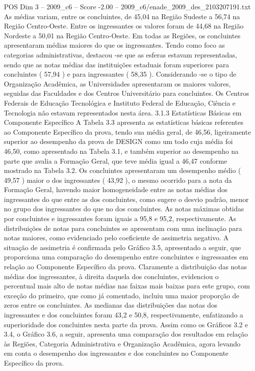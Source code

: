 \begin{textsample}{POS Dim 3 – 2009\_c6 – Score -2.00 – 2009\_c6/enade\_2009\_des\_2103207191.txt}
As médias variam, entre os concluintes, de 45,04 na Região Sudeste a 56,74 na Região Centro-Oeste.
Entre os ingressantes os valores foram de 44,68 na Região Nordeste a 50,01 na Região Centro-Oeste.
Em todas as Regiões, os concluintes apresentaram médias maiores do que os ingressantes.
Tendo como foco as categorias administrativas, destacou -se que as esferas estavam representadas, sendo que as notas médias das instituições estaduais foram superiores para concluintes ( 57,94 ) e para ingressantes ( 58,35 ).
Considerando -se o tipo de Organização Acadêmica, as Universidades apresentaram os maiores valores, seguidas das Faculdades e dos Centros Universitário para concluintes.
Os Centros Federais de Educação Tecnológica e Instituto Federal de Educação, Ciência e Tecnologia não estavam representados nesta área. 3.1.3 Estatísticas Básicas em Componente Específico A Tabela 3.3 apresenta as estatísticas básicas referentes ao Componente Específico da prova, tendo sua média geral, de 46,56, ligeiramente superior ao desempenho da prova de DESIGN como um todo cuja média foi 46,50, como apresentado na Tabela 3.1, e também superior ao desempenho na parte que avalia a Formação Geral, que teve média igual a 46,47 conforme mostrado na Tabela 3.2.
Os concluintes apresentaram um desempenho médio ( 49,57 ) maior o dos ingressantes ( 43,92 ), o mesmo ocorrido para a nota da Formação Geral, havendo maior homogeneidade entre as notas médias dos ingressantes do que entre as dos concluintes, como sugere o desvio padrão, menor no grupo dos ingressantes do que no dos concluintes.
As notas máximas obtidas por concluintes e ingressantes foram iguais a 95,8 e 95,2, respectivamente.
As distribuições de notas para concluintes se apresentam com uma inclinação para notas maiores, como evidenciado pelo coeficiente de assimetria negativo.
A situação de assimetria é confirmada pelo Gráfico 3.5, apresentado a seguir, que proporciona uma comparação do desempenho entre concluintes e ingressantes em relação ao Componente Específico da prova.
Claramente a distribuição das notas médias dos ingressantes, à direita daquela dos concluintes, evidenciou o percentual mais alto de notas médias nas faixas mais baixas para este grupo, com exceção do primeiro, que como já comentado, incluiu uma maior proporção de zeros entre os concluintes.
As medianas das distribuições das notas dos ingressantes e dos concluintes foram 43,2 e 50,8, respectivamente, enfatizando a superioridade dos concluintes nesta parte da prova.
Assim como os Gráficos 3.2 e 3.4, o Gráfico 3.6, a seguir, apresenta uma comparação dos resultados em relação às Regiões, Categoria Administrativa e Organização Acadêmica, agora levando em conta o desempenho dos ingressantes e dos concluintes no Componente Específico da prova.

\end{textsample}
